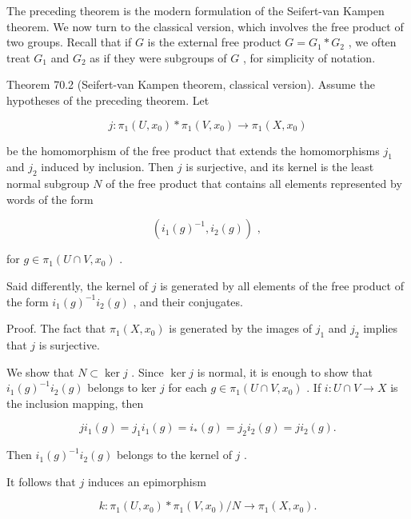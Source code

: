 \documentclass[10pt]{article}
\begin{document}
The preceding theorem is the modern formulation of the Seifert-van Kampen theorem. We now turn to the classical version, which involves the free product of two groups. Recall that if \(G\) is the external free product \(G = {G}_{1} * {G}_{2}\) , we often treat \({G}_{1}\) and \({G}_{2}\) as if they were subgroups of \(G\) , for simplicity of notation.

Theorem 70.2 (Seifert-van Kampen theorem, classical version). Assume the hypotheses of the preceding theorem. Let

\[
j : {\pi }_{1}\left( {U,{x}_{0}}\right)  * {\pi }_{1}\left( {V,{x}_{0}}\right)  \rightarrow  {\pi }_{1}\left( {X,{x}_{0}}\right)
\]

be the homomorphism of the free product that extends the homomorphisms \({j}_{1}\) and \({j}_{2}\) induced by inclusion. Then \(j\) is surjective, and its kernel is the least normal subgroup \(N\) of the free product that contains all elements represented by words of the form

\[
\left( {{i}_{1}{\left( g\right) }^{-1},{i}_{2}\left( g\right) }\right) \text{ , }
\]

for \(g \in  {\pi }_{1}\left( {U \cap  V,{x}_{0}}\right)\) .

Said differently, the kernel of \(j\) is generated by all elements of the free product of the form \({i}_{1}{\left( g\right) }^{-1}{i}_{2}\left( g\right)\) , and their conjugates.

Proof. The fact that \({\pi }_{1}\left( {X,{x}_{0}}\right)\) is generated by the images of \({j}_{1}\) and \({j}_{2}\) implies that \(j\) is surjective.

We show that \(N \subset  \ker j\) . Since \(\ker j\) is normal, it is enough to show that \({i}_{1}{\left( g\right) }^{-1}{i}_{2}\left( g\right)\) belongs to ker \(j\) for each \(g \in  {\pi }_{1}\left( {U \cap  V,{x}_{0}}\right)\) . If \(i : U \cap  V \rightarrow  X\) is the inclusion mapping, then

\[
j{i}_{1}\left( g\right)  = {j}_{1}{i}_{1}\left( g\right)  = {i}_{ * }\left( g\right)  = {j}_{2}{i}_{2}\left( g\right)  = j{i}_{2}\left( g\right) .
\]

Then \({i}_{1}{\left( g\right) }^{-1}{i}_{2}\left( g\right)\) belongs to the kernel of \(j\) .

It follows that \(j\) induces an epimorphism

\[
k : {\pi }_{1}\left( {U,{x}_{0}}\right)  * {\pi }_{1}\left( {V,{x}_{0}}\right) /N \rightarrow  {\pi }_{1}\left( {X,{x}_{0}}\right) .
\]
\end{document}
